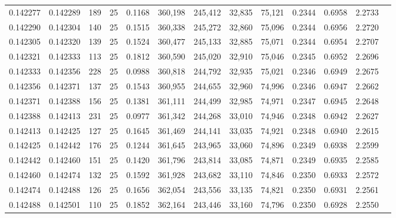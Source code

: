 \begin{tabular}{rrrrrrrrrrrrr}
0.142277 & 0.142289 &   189 &  25 &                                     0.1168 & 360,198 & 245,412 &  32,835 &  75,121 & 0.2344 & 0.6958 & 2.2733 \\
0.142290 & 0.142304 &   140 &  25 &                                     0.1515 & 360,338 & 245,272 &  32,860 &  75,096 & 0.2344 & 0.6956 & 2.2720 \\
0.142305 & 0.142320 &   139 &  25 &                                     0.1524 & 360,477 & 245,133 &  32,885 &  75,071 & 0.2344 & 0.6954 & 2.2707 \\
0.142321 & 0.142333 &   113 &  25 &                                     0.1812 & 360,590 & 245,020 &  32,910 &  75,046 & 0.2345 & 0.6952 & 2.2696 \\
0.142333 & 0.142356 &   228 &  25 &                                     0.0988 & 360,818 & 244,792 &  32,935 &  75,021 & 0.2346 & 0.6949 & 2.2675 \\
0.142356 & 0.142371 &   137 &  25 &                                     0.1543 & 360,955 & 244,655 &  32,960 &  74,996 & 0.2346 & 0.6947 & 2.2662 \\
0.142371 & 0.142388 &   156 &  25 &                                     0.1381 & 361,111 & 244,499 &  32,985 &  74,971 & 0.2347 & 0.6945 & 2.2648 \\
0.142388 & 0.142413 &   231 &  25 &                                     0.0977 & 361,342 & 244,268 &  33,010 &  74,946 & 0.2348 & 0.6942 & 2.2627 \\
0.142413 & 0.142425 &   127 &  25 &                                     0.1645 & 361,469 & 244,141 &  33,035 &  74,921 & 0.2348 & 0.6940 & 2.2615 \\
0.142425 & 0.142442 &   176 &  25 &                                     0.1244 & 361,645 & 243,965 &  33,060 &  74,896 & 0.2349 & 0.6938 & 2.2599 \\
0.142442 & 0.142460 &   151 &  25 &                                     0.1420 & 361,796 & 243,814 &  33,085 &  74,871 & 0.2349 & 0.6935 & 2.2585 \\
0.142460 & 0.142474 &   132 &  25 &                                     0.1592 & 361,928 & 243,682 &  33,110 &  74,846 & 0.2350 & 0.6933 & 2.2572 \\
0.142474 & 0.142488 &   126 &  25 &                                     0.1656 & 362,054 & 243,556 &  33,135 &  74,821 & 0.2350 & 0.6931 & 2.2561 \\
0.142488 & 0.142501 &   110 &  25 &                                     0.1852 & 362,164 & 243,446 &  33,160 &  74,796 & 0.2350 & 0.6928 & 2.2550 \\

\end{tabular}
